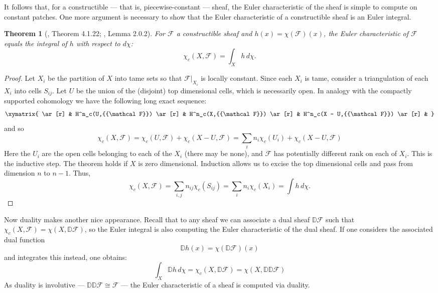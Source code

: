 \documentclass{psapm-l}
\newtheorem{theorem}{Theorem}[section]
\theoremstyle{definition}
\theoremstyle{remark}
\numberwithin{equation}{section}
\begin{document}
It follows that, for a constructible --- that is, piecewise-constant --- sheaf, the Euler characteristic of the sheaf is simple to compute on constant patches. One more argument is necessary to show that the Euler characteristic of a constructible sheaf is an Euler integral.

\begin{theorem}[\cite{Dimca}, Theorem 4.1.22; \cite{Schurmann}, Lemma 2.0.2]
For ${{\mathcal F}}$ a constructible sheaf and $h(x)=\chi({{\mathcal F}})(x)$, the Euler characteristic of ${{\mathcal F}}$ equals the integral of $h$ with respect to $d\chi$:
\begin{equation}
    \chi_c(X,{{\mathcal F}})=\int_X h\,d\chi.
\end{equation}
\end{theorem}
\begin{proof}
Let $X_i$ be the partition of $X$ into tame sets so that ${{\mathcal F}}|_{X_i}$ is locally constant. Since each $X_i$ is tame, consider a triangulation of each $X_i$ into cells $S_{ij}$. Let $U$ be the union of the (disjoint) top dimensional cells, which is necessarily open. In analogy with the compactly supported cohomology we have the following long exact sequence:
\begin{equation}
\displaystyle
\xymatrix{
\ar[r] & H^n_c(U,{{\mathcal F}}) \ar[r] & H^n_c(X,{{\mathcal F}}) \ar[r] & H^n_c(X - U,{{\mathcal F}}) \ar[r] & }
\end{equation}
and so
\[
	\chi_c(X,{{\mathcal F}})=\chi_c(U,{{\mathcal F}})+\chi_c(X-U,{{\mathcal F}})=\sum_i n_i\chi_c(U_i)+\chi_c(X-U,{{\mathcal F}})
\]
Here the $U_i$ are the open cells belonging to each of the $X_i$ (there may be none), and ${{\mathcal F}}$ has potentially different rank on each of $X_i$. This is the inductive step. The theorem holds if $X$ is zero dimensional. Induction allows us to excise the top dimensional cells and pass from dimension $n$ to $n-1$. Thus,
\[
	\chi_c(X,{{\mathcal F}})=\sum_{i,j}n_{ij}\chi_c(S_{ij})=\sum_i n_i\chi_c(X_i)=\int h\,d\chi.
\]
\end{proof}

Now duality makes another nice appearance. Recall that to any sheaf we can associate a dual sheaf ${{\mathbb{D}}}{{\mathcal F}}$ such that $\chi_c(X,{{\mathcal F}})=\chi(X,{{\mathbb{D}}}{{\mathcal F}})$, so the Euler integral is also computing the Euler characteristic of the dual sheaf. If one considers the associated dual function
\[
       {{\mathbb{D}}} h(x)=\chi({{\mathbb{D}}}{{\mathcal F}})(x)
\]
and integrates this instead, one obtains:
\[
       \int_X {{\mathbb{D}}} h\,d\chi=\chi_c(X,{{\mathbb{D}}}{{\mathcal F}})=\chi(X,{{\mathbb{D}}}{{\mathbb{D}}}{{\mathcal F}})
\]
As duality is involutive --- ${{\mathbb{D}}}{{\mathbb{D}}}{{\mathcal F}}\cong{{\mathcal F}}$ --- the Euler characteristic of a sheaf is computed via duality.
\end{document}
